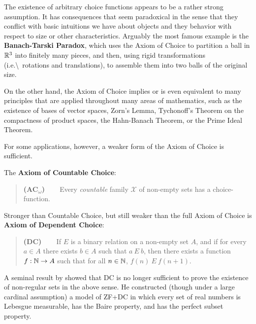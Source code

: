The existence of arbitrary choice functions appears to be a rather strong assumption. It has consequences that seem paradoxical in the sense that they conflict with basic intuitions we have about objects and they behavior with respect to size or other characteristics. Arguably the most famous example is the \textbf{Banach-Tarski Paradox}, which uses the Axiom of Choice to partition a ball in $\mathbb{R}^3$ into finitely many pieces, and then, using rigid transformations (i.e.{\textbackslash}~rotations and translations), to assemble them into two balls of the original size.

On the other hand, the Axiom of Choice implies or is even equivalent to many principles that are applied throughout many areas of mathematics, such as the existence of bases of vector spaces, Zorn's Lemma, Tychonoff's Theorem on the compactness of product spaces, the Hahn-Banach Theorem, or the Prime Ideal Theorem.

For some applications, however, a weaker form of the Axiom of Choice is sufficient.

The \textbf{Axiom of Countable Choice}:

\begin{quote}
\textbf{(AC\textsubscript{$\omega$})} ~~~ Every \textit{countable} family $\mathcal{X}$ of non-empty sets has a choice-function.
\end{quote}

Stronger than Countable Choice, but still weaker than the full Axiom of Choice is  \textbf{Axiom of Dependent Choice}:

\begin{quote}
\textbf{(DC)} ~~~ If $E$ is a binary relation on a non-empty set $A$, and if for every $a \in A$ there exists $b \in A$ such that $a \: E\: b$, then there exists a function $f:\mathbb{N} \to A$ such that for all $n \in \mathbb{N}$, $f(n) \: E \: f(n+1)$.
\end{quote}

A seminal result by \citet{Solovay:1970a} showed that DC is no longer sufficient to prove the existence of non-regular sets in the above sense. He constructed (though under a large cardinal assumption) a model of ZF+DC in which every set of real numbers is Lebesgue measurable, has the Baire property, and has the perfect subset property.